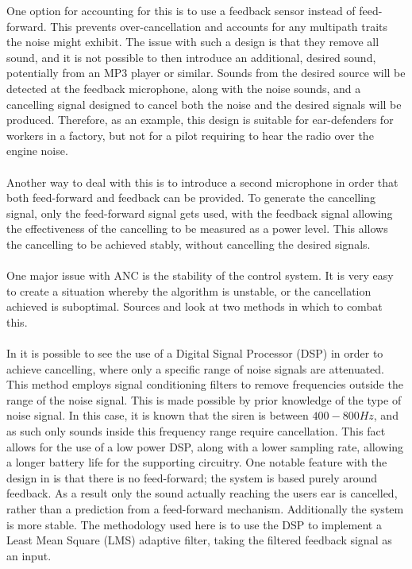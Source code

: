 One option for accounting for this is to use a feedback sensor instead of feed-forward.
This prevents over-cancellation and accounts for any multipath traits the noise might exhibit.
The issue with such a design is that they remove all sound, and it is not possible to then introduce an additional, desired sound, potentially from an MP3 player or similar.
Sounds from the desired source will be detected at the feedback microphone, along with the noise sounds, and a cancelling signal designed to cancel both the noise and the desired signals will be produced.
Therefore, as an example, this design is suitable for ear-defenders for workers in a factory, but not for a pilot requiring to hear the radio over the engine noise.
\\
\\
Another way to deal with this is to introduce a second microphone \cite{EMNoiseCancel,2SensorANCAlg} in order that both feed-forward and feedback can be provided.
To generate the cancelling signal, only the feed-forward signal gets used, with the feedback signal allowing the effectiveness of the cancelling to be measured as a power level.
This allows the cancelling to be achieved stably, without cancelling the desired signals.
\\
\\
\nocite{*}
One major issue with ANC is the stability of the control system.
It is very easy to create a situation whereby the algorithm is unstable, or the cancellation achieved is suboptimal.
Sources \cite{AuralEnvironmentAdjANC} and \cite{ANCOptimalControlInf} look at two methods in which to combat this.
\\
\\
In \cite{EMHeadsets} it is possible to see the use of a Digital Signal Processor (DSP) in order to achieve cancelling, where only a specific range of noise signals are attenuated.
This method employs signal conditioning filters to remove frequencies outside the range of the noise signal.
This is made possible by prior knowledge of the type of noise signal.
In this case, it is known that the siren is between $400-800Hz$, and as such only sounds inside this frequency range require cancellation.
This fact allows for the use of a low power DSP, along with a lower sampling rate, allowing a longer battery life for the supporting circuitry.
One notable feature with the design in \cite{EMHeadsets} is that there is no feed-forward; the system is based purely around feedback.
As a result only the sound actually reaching the users ear is cancelled, rather than a prediction from a feed-forward mechanism.
Additionally the system is more stable.
The methodology used here is to use the DSP to implement a Least Mean Square (LMS) adaptive filter, taking the filtered feedback signal as an input.

